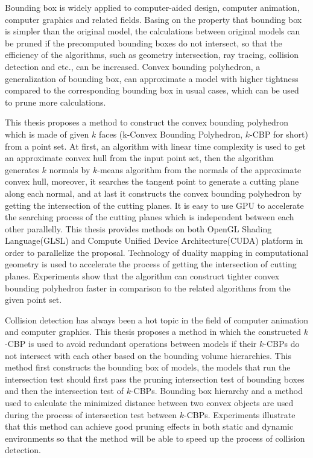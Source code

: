 \begin{eabstract} 
Bounding box is widely applied to computer-aided design, computer animation, computer graphics and related fields. 
Basing on the property that bounding box is simpler than the original model, the calculations between original models can be pruned if the precomputed bounding boxes do not intersect, so that the efficiency of the algorithms, such as geometry intersection, ray tracing, collision detection and etc., can be increased.
Convex bounding polyhedron, a generalization of bounding box,  can approximate a model with higher tightness compared to the corresponding bounding box in usual cases, which can be used to prune more calculations.

This thesis proposes a method to construct the convex bounding polyhedron which is made of given $k$ faces (k-Convex Bounding Polyhedron, $k$-CBP for short) from a point set.
At first, an algorithm with linear time complexity is used to get an approximate convex hull from the input point set, 
then the algorithm generates $k$ normals by $k$-means algorithm from the normals of the approximate convex hull,  
moreover, it searches the tangent point to generate a cutting plane along each normal,
and at last it constructs the convex bounding polyhedron by getting the intersection of the cutting planes. 
It is easy to use GPU to accelerate the searching process of the cutting planes which is independent between each other parallelly.
This thesis provides methods on both OpenGL Shading Language(GLSL) and Compute Unified Device Architecture(CUDA) platform in order to parallelize the proposal. 
Technology of duality mapping in computational geometry is used to accelerate the process of getting the intersection of cutting planes. 
Experiments show that the algorithm can construct tighter convex bounding polyhedron faster in comparison to the related algorithms from the given point set.

Collision detection has always been a hot topic in the field of computer animation and computer graphics. 
This thesis proposes a method in which the constructed $k$-CBP is used to avoid redundant operations between models if their $k$-CBPs do not intersect with each other based on the bounding volume hierarchies.
This method first constructs the bounding box of models, the models that run the intersection test should first pass the pruning intersection test of bounding boxes and then the intersection test of $k$-CBPs. 
Bounding box hierarchy and a method used to calculate the minimized distance between two convex objects are used during the process of intersection test between $k$-CBPs. 
Experiments illustrate that this method can achieve good pruning effects in both static and dynamic environments so that the method will be able to speed up the process of collision detection.

\end{eabstract}

